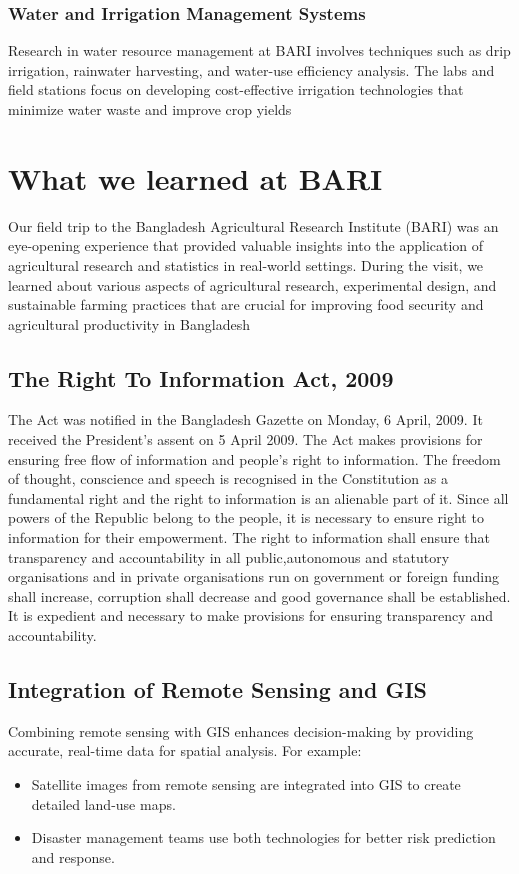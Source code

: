 \documentclass[oneside,12pt,fleqn]{book}
\begin{document}
\subsection{Water and Irrigation Management Systems}
Research in water resource management at BARI involves techniques such as drip irrigation, rainwater harvesting, and water-use efficiency analysis. The labs and field stations focus on developing cost-effective irrigation technologies that minimize water waste and improve crop yields
\chapter{What we learned at BARI}
Our field trip to the Bangladesh Agricultural Research Institute (BARI) was an eye-opening experience that provided valuable insights into the application of agricultural research and statistics in real-world settings. During the visit, we learned about various aspects of agricultural research, experimental design, and sustainable farming practices that are crucial for improving food security and agricultural productivity in Bangladesh
\section{The Right To Information Act, 2009}
 The Act was notified in the Bangladesh Gazette on Monday, 6 April, 2009. It received the President’s assent on 5 April 2009. The Act makes provisions for ensuring free flow of information and people’s right to information.
 The freedom of thought, conscience and speech is recognised in the Constitution as a fundamental right and the right to information is an alienable part of it. Since all powers of the Republic belong to the people, it is necessary to ensure right to information for their empowerment. The right to
 information shall ensure that transparency and accountability in all public,autonomous and statutory organisations and in private organisations run
 on government or foreign funding shall increase, corruption shall decrease and good governance shall be established. It is expedient and necessary to make provisions for ensuring transparency and accountability.
\section{Integration of Remote Sensing and GIS}
Combining remote sensing with GIS enhances decision-making by providing accurate, real-time data for spatial analysis. For example:
\begin{itemize}
    \item Satellite images from remote sensing are integrated into GIS to create detailed land-use maps.
    \item Disaster management teams use both technologies for better risk prediction and response.\\
\end{itemize}
\end{document}
